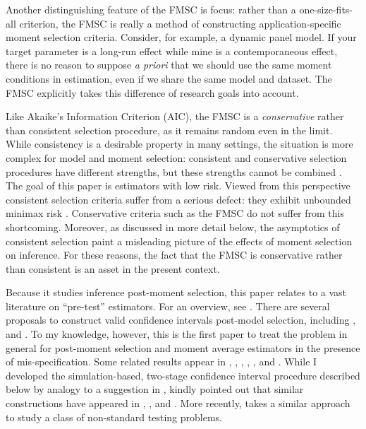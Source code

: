 Another distinguishing feature of the FMSC is focus: rather than a one-size-fits-all criterion, the FMSC is really a method of constructing application-specific moment selection criteria.
Consider, for example, a dynamic panel model.
If your target parameter is a long-run effect while mine is a contemporaneous effect, there is no reason to suppose \emph{a priori} that we should use the same moment conditions in estimation, even if we share the same model and dataset.
The FMSC explicitly takes this difference of research goals into account.

Like Akaike's Information Criterion (AIC), the FMSC is a \emph{conservative} rather than consistent selection procedure, as it remains random even in the limit.	
While consistency is a desirable property in many settings, the situation is more complex for model and moment selection: consistent and conservative selection procedures have different strengths, but these strengths cannot be combined \citep{Yang2005}.
The goal of this paper is estimators with low risk.
Viewed from this perspective consistent selection criteria suffer from a serious defect: they exhibit unbounded minimax risk \citep{LeebPoetscher2008}.  
Conservative criteria such as the FMSC do not suffer from this shortcoming.
Moreover, as discussed in more detail below, the asymptotics of consistent selection paint a misleading picture of the effects of moment selection on inference.
For these reasons, the fact that the FMSC is conservative rather than consistent is an asset in the present context.

Because it studies inference post-moment selection, this paper relates to a vast literature on ``pre-test'' estimators.
For an overview, see \citet{LeebPoetscher2005, LeebPoetscher2009}.
There are several proposals to construct valid confidence intervals post-model selection, including \cite{Kabaila1998}, \cite{HjortClaeskens} and \cite{KabailaLeeb2006}. 
To my knowledge, however, this is the first paper to treat the problem in general for post-moment selection and moment average estimators in the presence of mis-specification.
Some related results appear in \cite{Berkowitz2008}, \cite{Berkowitz2012}, \cite{Guggenberger2010}, \cite{Guggenberger2012}, \cite{GuggenbergerKumar}, and \cite{Caner2014}.
While I developed the simulation-based, two-stage confidence interval procedure described below by analogy to a suggestion in \cite{ClaeskensHjortbook}, \cite{Leeb} kindly pointed out that similar constructions have appeared in \cite{Loh1985}, \cite{Berger1994}, and \cite{Silvapulle1996}. More recently, \cite{McCloskey} takes a similar approach to study a class of non-standard testing problems.

